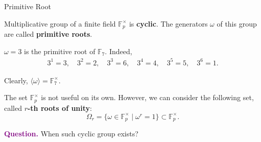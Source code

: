 \documentclass{zkdl-presentation-template}
\begin{document}
    \begin{frame}{Primitive Root}
        \begin{theorem}
            Multiplicative group of a finite field $\mathbb{F}^{\times}_p$ is
            \textbf{cyclic}. The generators $\omega$ of this group are called
            \textbf{primitive roots}.
        \end{theorem}

        \begin{example}
            $\omega=3$ is the primitive root of $\mathbb{F}_7$. Indeed,
            \begin{align*}
                3^1 = 3, \quad 3^2 = 2, \quad 3^3 = 6, \quad 3^4 = 4, \quad 3^5 = 5, \quad 3^6 = 1.
            \end{align*} 

            Clearly, $\langle \omega \rangle = \mathbb{F}_7^{\times}$.
        \end{example}

        The set $\mathbb{F}^{\times}_p$ is not useful on its own. However, we
        can consider the following set, called \textbf{$r$-th roots of unity}:
        \begin{equation*}
            \Omega_r = \{ \omega \in \mathbb{F}^{\times}_p \mid \omega^r = 1 \} \subset \mathbb{F}_p^{\times}.
        \end{equation*}

        \vspace{-15px}

        \textcolor{purple}{\textbf{Question.}} When such cyclic group exists?
    \end{frame}
\end{document}
